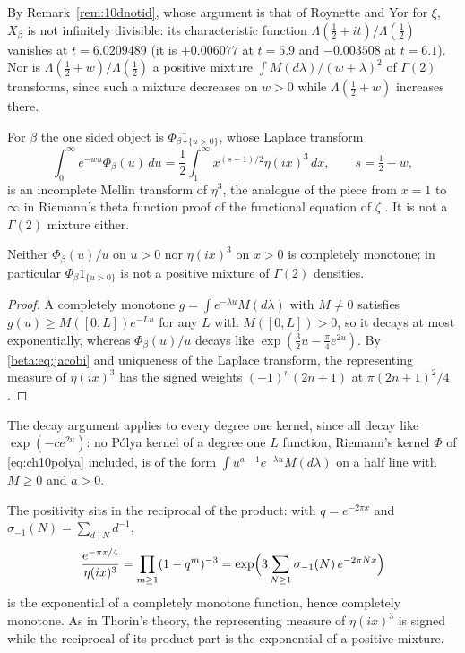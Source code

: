 By Remark~\ref{rem:10dnotid}, whose argument is that of Roynette and Yor \cite{roynetteyor2005} for $\xi$, $X_\beta$ is not infinitely divisible: its characteristic function $\Lambda(\tfrac12+it)/\Lambda(\tfrac12)$ vanishes at $t=6.0209489$ (it is $+0.006077$ at $t=5.9$ and $-0.003508$ at $t=6.1$). Nor is $\Lambda(\tfrac12+w)/\Lambda(\tfrac12)$ a positive mixture $\int M(d\lambda)/(w+\lambda)^2$ of $\Gamma(2)$ transforms, since such a mixture decreases on $w>0$ while $\Lambda(\tfrac12+w)$ increases there.

For $\beta$ the one sided object is $\Phi_\beta1_{\{u>0\}}$, whose Laplace transform
\[
\int_0^\infty e^{-wu}\Phi_\beta(u)\,du=\frac12\int_1^\infty x^{(s-1)/2}\eta(ix)^3\,dx,\qquad s=\tfrac12-w,
\]
is an incomplete Mellin transform of $\eta^3$, the analogue of the piece from $x=1$ to $\infty$ in Riemann's theta function proof of the functional equation of $\zeta$ \cite{titchmarsh1986}. It is not a $\Gamma(2)$ mixture either.

\begin{proposition}\label{beta:prop:nocm}
Neither $\Phi_\beta(u)/u$ on $u>0$ nor $\eta(ix)^3$ on $x>0$ is completely monotone; in particular $\Phi_\beta1_{\{u>0\}}$ is not a positive mixture of $\Gamma(2)$ densities.
\end{proposition}

\begin{proof}
A completely monotone $g=\int e^{-\lambda u}M(d\lambda)$ with $M\ne0$ satisfies $g(u)\ge M([0,L])e^{-Lu}$ for any $L$ with $M([0,L])>0$, so it decays at most exponentially, whereas $\Phi_\beta(u)/u$ decays like $\exp(\tfrac32u-\tfrac\pi4e^{2u})$. By \eqref{beta:eq:jacobi} and uniqueness of the Laplace transform, the representing measure of $\eta(ix)^3$ has the signed weights $(-1)^n(2n+1)$ at $\pi(2n+1)^2/4$.
\end{proof}

The decay argument applies to every degree one kernel, since all decay like $\exp(-ce^{2u})$: no P\'olya kernel of a degree one $L$ function, Riemann's kernel $\Phi$ of \eqref{eq:ch10polya} included, is of the form $\int u^{a-1}e^{-\lambda u}M(d\lambda)$ on a half line with $M\ge0$ and $a>0$.

The positivity sits in the reciprocal of the product: with $q=e^{-2\pi x}$ and $\sigma_{-1}(N)=\sum_{d\mid N}d^{-1}$,
\begin{equation}\label{beta:eq:recipprod}
\frac{e^{-\pi x/4}}{\eta(ix)^3}=\prod_{m\ge1}(1-q^m)^{-3}
=\exp\Bigl(3\sum_{N\ge1}\sigma_{-1}(N)\,e^{-2\pi Nx}\Bigr)
\end{equation}
is the exponential of a completely monotone function, hence completely monotone. As in Thorin's theory, the representing measure of $\eta(ix)^3$ is signed while the reciprocal of its product part is the exponential of a positive mixture.


